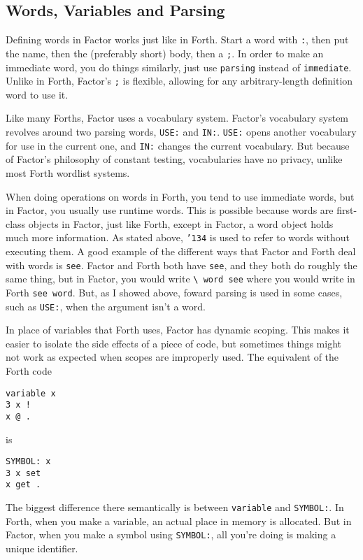 \documentclass{article}
\begin{document}
\subsection{Words, Variables and Parsing}

Defining words in Factor works just like in Forth. Start a word with \texttt{:}, then put the name, then the (preferably short) body, then a \texttt{;}. In order to make an immediate word, you do things similarly, just use \texttt{parsing} instead of \texttt{immediate}. Unlike in Forth, Factor's \texttt{;} is flexible, allowing for any arbitrary-length definition word to use it.

Like many Forths, Factor uses a vocabulary system. Factor's vocabulary system revolves around two parsing words, \texttt{USE:} and \texttt{IN:}. \texttt{USE:} opens another vocabulary for use in the current one, and \texttt{IN:} changes the current vocabulary. But because of Factor's philosophy of constant testing, vocabularies have no privacy, unlike most Forth wordlist systems. 

When doing operations on words in Forth, you tend to use immediate words, but in Factor, you usually use runtime words. This is possible because words are first-class objects in Factor, just like Forth, except in Factor, a word object holds much more information. As stated above, \texttt{\char'134} is used to refer to words without executing them. A good example of the different ways that Factor and Forth deal with words is \texttt{see}. Factor and Forth both have \texttt{see}, and they both do roughly the same thing, but in Factor, you would write \verb|\ word see| where you would write in Forth \verb|see word|. But, as I showed above, foward parsing is used in some cases, such as \texttt{USE:}, when the argument isn't a word.

In place of variables that Forth uses, Factor has dynamic scoping. This makes it easier to isolate the side effects of a piece of code, but sometimes things might not work as expected when scopes are improperly used. The equivalent of the Forth code
\begin{verbatim}
variable x
3 x !
x @ .
\end{verbatim}
is
\begin{verbatim}
SYMBOL: x
3 x set
x get .
\end{verbatim}
The biggest difference there semantically is between \texttt{variable} and \texttt{SYMBOL:}. In Forth, when you make a variable, an actual place in memory is allocated. But in Factor, when you make a symbol using \texttt{SYMBOL:}, all you're doing is making a unique identifier.
\end{document}
